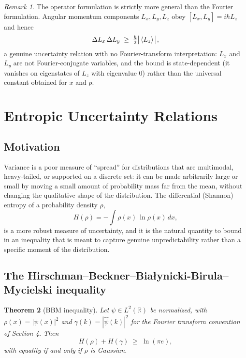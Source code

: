 \documentclass[11pt]{article}
\theoremstyle{plain}
\newtheorem{theorem}{Theorem}[section]
\theoremstyle{definition}
\theoremstyle{remark}
\newtheorem{remark}[theorem]{Remark}
\begin{document}
\begin{remark}
The operator formulation is strictly more general than the Fourier formulation. Angular momentum
components $L_x,L_y,L_z$ obey $[L_x,L_y]=i\hbar L_z$ and hence
\[
\Delta L_x\, \Delta L_y \;\geq\; \tfrac{\hbar}{2}\big|\expval{L_z}\big|,
\]
a genuine uncertainty relation with no Fourier-transform interpretation: $L_x$ and $L_y$ are not
Fourier-conjugate variables, and the bound is state-dependent (it vanishes on eigenstates of
$L_z$ with eigenvalue $0$) rather than the universal constant obtained for $x$ and $p$.
\end{remark}

\section{Entropic Uncertainty Relations}

\subsection{Motivation}

Variance is a poor measure of ``spread'' for distributions that are multimodal, heavy-tailed, or
supported on a discrete set: it can be made arbitrarily large or small by moving a small amount of
probability mass far from the mean, without changing the qualitative shape of the distribution.
The differential (Shannon) entropy of a probability density $\rho$,
\[
H(\rho) = -\int \rho(x)\, \ln \rho(x)\, dx ,
\]
is a more robust measure of uncertainty, and it is the natural quantity to bound in an inequality
that is meant to capture genuine unpredictability rather than a specific moment of the
distribution.

\subsection{The Hirschman--Beckner--Bia\l ynicki-Birula--Mycielski inequality}

\begin{theorem}[BBM inequality]
Let $\psi \in L^2(\mathbb{R})$ be normalized, with $\rho(x)=|\psi(x)|^2$ and
$\gamma(k)=|\hat\psi(k)|^2$ for the Fourier transform convention of Section 4. Then
\[
H(\rho) + H(\gamma) \;\geq\; \ln(\pi e) ,
\]
with equality if and only if $\rho$ is Gaussian.
\end{theorem}
\end{document}

